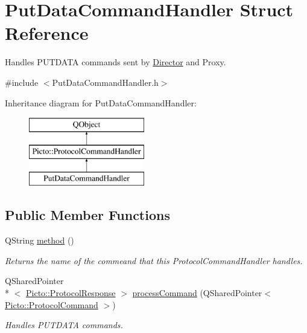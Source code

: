 \hypertarget{struct_put_data_command_handler}{\section{Put\-Data\-Command\-Handler Struct Reference}
\label{struct_put_data_command_handler}
}


Handles P\-U\-T\-D\-A\-T\-A commands sent by \hyperlink{class_director}{Director} and Proxy.  




{\ttfamily \#include $<$Put\-Data\-Command\-Handler.\-h$>$}

Inheritance diagram for Put\-Data\-Command\-Handler\-:\begin{figure}[H]
\begin{center}
\leavevmode
\includegraphics[height=3.000000cm]{struct_put_data_command_handler}
\end{center}
\end{figure}
\subsection*{Public Member Functions}
\begin{DoxyCompactItemize}
\item 
\hypertarget{struct_put_data_command_handler_a99c6ee1dc752d0944c62e89f9cb531bf}{Q\-String \hyperlink{struct_put_data_command_handler_a99c6ee1dc752d0944c62e89f9cb531bf}{method} ()}\label{struct_put_data_command_handler_a99c6ee1dc752d0944c62e89f9cb531bf}

\begin{DoxyCompactList}\small\item\em Returns the name of the commeand that this Protocol\-Command\-Handler handles. \end{DoxyCompactList}\item 
Q\-Shared\-Pointer\\*
$<$ \hyperlink{struct_picto_1_1_protocol_response}{Picto\-::\-Protocol\-Response} $>$ \hyperlink{struct_put_data_command_handler_accf2939419842553d46e126cd6980584}{process\-Command} (Q\-Shared\-Pointer$<$ \hyperlink{struct_picto_1_1_protocol_command}{Picto\-::\-Protocol\-Command} $>$)
\begin{DoxyCompactList}\small\item\em Handles P\-U\-T\-D\-A\-T\-A commands. \end{DoxyCompactList}\end{DoxyCompactItemize}


